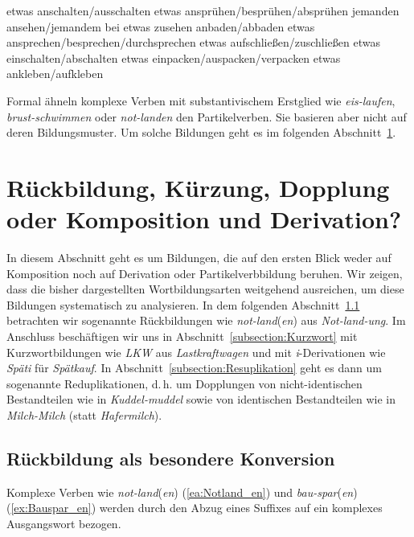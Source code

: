 \ea \label{ea:VPt_Kontrastformen}
\ea \label{ea:an_aus} etwas anschalten/ausschalten
\ex \label{ex:an_be_ab} etwas ansprühen/besprühen/absprühen
\ex \label{ex:an_zu} jemanden ansehen/jemandem bei etwas zusehen
\ex \label{ex:an_ab} anbaden/abbaden
\ex \label{ex:an_be_durch} etwas ansprechen/besprechen/durchsprechen
\ex \label{ex:auf_zu} etwas aufschließen/zuschließen
\ex \label{ex:ein_ab} etwas einschalten/abschalten
\ex \label{ex:ein_aus_ver} etwas einpacken/auspacken/verpacken
\ex \label{ex:an_auf} etwas ankleben/aufkleben
\z 
\z 

Formal ähneln komplexe Verben mit substantivischem Erstglied wie \textit{eis-laufen}, \textit{brust-schwimmen} oder \textit{not-landen} den Partikelverben. Sie basieren aber nicht auf deren Bildungsmuster. Um solche Bildungen geht es im folgenden Abschnitt~\ref{section:andere Wb-Arten}. 


\section{Rückbildung, Kürzung, Dopplung oder Komposition und Derivation?}\label{section:andere Wb-Arten}

In diesem Abschnitt geht es um Bildungen, die auf den ersten Blick weder auf Komposition noch auf Derivation oder Partikelverbbildung beruhen. Wir zeigen, dass die bisher dargestellten Wortbildungsarten weitgehend ausreichen, um diese Bildungen systematisch zu analysieren. In dem folgenden Abschnitt~\ref{subsection:Rückbildung} betrachten wir sogenannte Rückbildungen wie \textit{not-land}(\textit{en}) aus \textit{Not-land-ung}. Im Anschluss beschäftigen wir uns in Abschnitt~\ref{subsection:Kurzwort} mit Kurzwortbildungen wie \textit{LKW} aus \textit{Lastkraftwagen} und mit \textit{i}-Derivationen wie \textit{Späti} für \textit{Spätkauf}. In Abschnitt~\ref{subsection:Resuplikation} geht es dann um sogenannte Reduplikationen, d.\,h. um Dopplungen von nicht-identischen Bestandteilen wie in \textit{Kuddel-muddel} sowie von identischen Bestandteilen wie in \textit{Milch-Milch} (statt \textit{Hafermilch}).


\subsection{Rückbildung als besondere Konversion}\label{subsection:Rückbildung}

Komplexe Verben wie \textit{not-land}(\textit{en}) (\ref{ea:Notland_en}) und \textit{bau-spar}(\textit{en}) (\ref{ex:Bauspar_en}) werden durch den Abzug eines Suffixes auf ein komplexes Ausgangswort bezogen.

